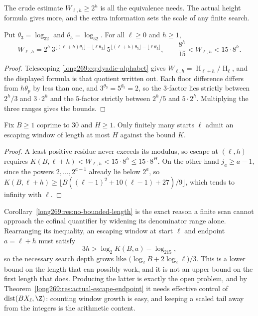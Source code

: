 \documentclass[11pt]{article}
\newcommand{\hgt}{\operatorname{H}}
\begin{document}
The crude estimate $W_{\ell,h}\ge2^{h}$ is all the equivalence needs.  The
actual height formula gives more, and the extra information sets the scale of
any finite search.

\begin{proposition}\label{long269:res:window-growth}
Put $\theta_3=\log_32$ and $\theta_5=\log_52$.  For all $\ell\ge0$ and
$h\ge1$,
\[
 W_{\ell,h}=2^{h}\,
 3^{\lfloor(\ell+h)\theta_3\rfloor-\lfloor\ell\theta_3\rfloor}\,
 5^{\lfloor(\ell+h)\theta_5\rfloor-\lfloor\ell\theta_5\rfloor},
 \qquad
 \frac{8^{h}}{15}<W_{\ell,h}<15\cdot8^{h} .
\]
\end{proposition}

\begin{proof}
Telescoping \eqref{long269:eq:dyadic-alphabet} gives
$W_{\ell,h}=\hgt_{\ell+h}/\hgt_\ell$, and the displayed formula is that
quotient written out.  Each floor difference differs from $h\theta_p$ by less
than one, and $3^{\theta_3}=5^{\theta_5}=2$, so the $3$-factor lies strictly
between $2^{h}/3$ and $3\cdot2^{h}$ and the $5$-factor strictly between
$2^{h}/5$ and $5\cdot2^{h}$.  Multiplying the three ranges gives the bounds.
\end{proof}

\begin{corollary}\label{long269:res:no-bounded-length}
Fix $B\ge1$ coprime to $30$ and $H\ge1$.  Only finitely many starts $\ell$
admit an escaping window of length at most $H$ against the bound $K$.
\end{corollary}

\begin{proof}
A least positive residue never exceeds its modulus, so escape at $(\ell,h)$
requires $K(B,\ell+h)<W_{\ell,h}<15\cdot8^{h}\le15\cdot8^{H}$.  On the other
hand $j_a\ge a-1$, since the powers $2,\ldots,2^{a-1}$ already lie below
$2^{a}$, so $K(B,\ell+h)\ge\lfloor B((\ell-1)^{2}+10(\ell-1)+27)/9\rfloor$,
which tends to infinity with $\ell$.
\end{proof}

\noindent Corollary~\ref{long269:res:no-bounded-length} is the exact reason a finite
scan cannot approach the cofinal quantifier by widening its denominator range
alone.  Rearranging its inequality, an escaping window at start $\ell$ and
endpoint $a=\ell+h$ must satisfy
\[
 3h>\log_2K(B,a)-\log_215,
\]
so the necessary search depth grows like
$\bigl(\log_2B+2\log_2\ell\bigr)/3$.  This is a lower bound on the length that can
possibly work, and it is not an upper bound on the first length that does.
Producing the latter is exactly the open problem, and by
Theorem~\ref{long269:res:actual-escape-endpoint} it needs effective control of
$\operatorname{dist}(BX_\ell,\Z)$: counting window growth is easy, and keeping
a scaled tail away from the integers is the arithmetic content.
\end{document}
